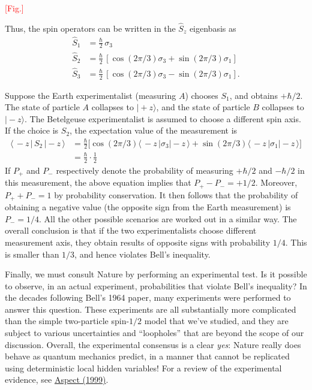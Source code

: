 \documentclass[pra,11pt]{revtex4}
\begin{document}
\textcolor{red}{[Fig.]}

Thus, the spin operators can be written in the $\hat{S}_z$ eigenbasis as
$$\begin{aligned}\hat{S}_1 &= \frac{\hbar}{2} \, \sigma_3 \\ \hat{S}_2 &= \frac{\hbar}{2} \, \left[\cos(2\pi/3) \sigma_3 + \sin(2\pi/3)\sigma_1\right]  \\   \hat{S}_3 &= \frac{\hbar}{2} \, \left[\cos(2\pi/3) \sigma_3 - \sin(2\pi/3)\sigma_1\right].\end{aligned}$$

Suppose the Earth experimentalist (measuring $A$) chooses $S_1$, and
obtains $+\hbar/2$.  The state of particle $A$ collapses to
$|\!+\!z\rangle$, and the state of particle $B$ collapses to
$|\!-\!z\rangle$.  The Betelgeuse experimentalist is assumed to
choose a different spin axis.  If the choice is $S_2$, the expectation
value of the measurement is
$$\begin{aligned}\langle\, - z \, | \, S_2 \,|-\!z\,\rangle &= \frac{\hbar}{2} \Big[\cos(2\pi/3) \langle\,- z\,|\sigma_3| - \!z\,\rangle + \sin(2\pi/3)\langle\,- z\,|\sigma_1|-\!z\,\rangle\Big]\\ &= \frac{\hbar}{2} \cdot \frac{1}{2} \end{aligned}$$
If $P_+$ and $P_-$ respectively denote the probability of measuring
$+\hbar/2$ and $-\hbar/2$ in this measurement, the above equation
implies that $P_+ - P_- = + 1/2$.  Moreover, $P_+ + P_- = 1$ by
probability conservation.  It then follows that the probability of
obtaining a negative value (the opposite sign from the Earth
measurement) is $P_- = 1/4$.  All the other possible scenarios are
worked out in a similar way.  The overall conclusion is that if the
two experimentalists choose different measurement axis, they obtain
results of opposite signs with probability $1/4$.  This is smaller
than $1/3$, and hence violates Bell's inequality.

Finally, we must consult Nature by performing an experimental test.
Is it possible to observe, in an actual experiment, probabilities that
violate Bell's inequality?  In the decades following Bell's 1964
paper, many experiments were performed to answer this question.  These
experiments are all substantially more complicated than the simple
two-particle spin-$1/2$ model that we've studied, and they are subject
to various uncertainties and ``loopholes'' that are beyond the scope
of our discussion.  Overall, the experimental consensus is a clear
\textit{yes}: Nature really does behave as quantum mechanics predict,
in a manner that cannot be replicated using deterministic local hidden
variables!  For a review of the experimental evidence, see
\hyperref[cite:aspect]{Aspect (1999)}.
\end{document}
